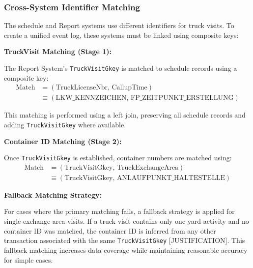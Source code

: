         

  

        \subsubsection{Cross-System Identifier Matching}

        The schedule and Report systems use different identifiers for truck visits. To create a unified event log, these systems must be linked using composite keys:
        
        \textbf{TruckVisit Matching (Stage 1):}
        
        The Report System's \texttt{TruckVisitGkey} is matched to schedule records using a composite key:
        \begin{equation}
        \begin{aligned}
            \text{Match} &= (\text{TruckLicenseNbr},\, \text{CallupTime}) \\
                         &\equiv (\text{LKW\_KENNZEICHEN},\, \text{FP\_ZEITPUNKT\_ERSTELLUNG})
        \end{aligned}
        \end{equation}
        
        This matching is performed using a left join, preserving all schedule records and adding \texttt{TruckVisitGkey} where available.
        
        \textbf{Container ID Matching (Stage 2):}
        
        Once \texttt{TruckVisitGkey} is established, container numbers are matched using:
        \begin{equation}
        \begin{aligned}
            \text{Match} &= (\text{TruckVisitGkey},\, \text{TruckExchangeArea}) \\
                         &\equiv (\text{TruckVisitGkey},\, \text{ANLAUFPUNKT\_HALTESTELLE})
        \end{aligned}
        \end{equation}
        
        \textbf{Fallback Matching Strategy:}
        
        For cases where the primary matching fails, a fallback strategy is applied for single-exchange-area visits. If a truck visit contains only one yard activity and no container ID was matched, the container ID is inferred from any other transaction associated with the same \texttt{TruckVisitGkey} [JUSTIFICATION]. This fallback matching increases data coverage while maintaining reasonable accuracy for simple cases.
        
